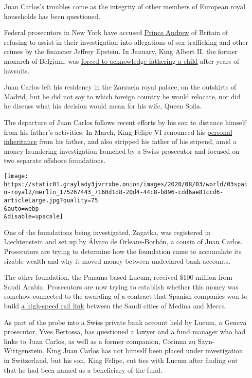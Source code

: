Juan Carlos's troubles come as the integrity of other members of
European royal households has been questioned.

Federal prosecutors in New York have accused
\href{https://www.nytimes3xbfgragh.onion/2020/06/08/nyregion/jeffrey-epstein-prince-andrew.html}{Prince
Andrew} of Britain of refusing to assist in their investigation into
allegations of sex trafficking and other crimes by the financier Jeffrey
Epstein. In January, King Albert II, the former monarch of Belgium, was
\href{https://www.nytimes3xbfgragh.onion/2020/01/28/world/europe/belgium-king-albert-delphine-boel.html}{forced
to acknowledge fathering a child} after years of lawsuits.

Juan Carlos left his residency in the Zarzuela royal palace, on the
outskirts of Madrid, but he did not say to which foreign country he
would relocate, nor did he discuss what his decision would mean for his
wife, Queen Sofia.

The departure of Juan Carlos follows recent efforts by his son to
distance himself from his father's activities. In March, King Felipe VI
renounced his
\href{https://www.nytimes3xbfgragh.onion/2020/03/15/world/europe/king-felipe-juan-carlos-spain.html}{personal
inheritance} from his father, and also stripped his father of his
stipend, amid a money laundering investigation launched by a Swiss
prosecutor and focused on two separate offshore foundations.

\texttt{[image: https://static01.graylady3jvrrxbe.onion/images/2020/08/03/world/03spain-royal2/merlin\_175267443\_7160d1d8-20d4-44c8-b896-cdd6ae81ccd6-articleLarge.jpg?quality=75\\\&auto=webp\\\&disable=upscale]}

One of the foundations being investigated, Zagatka, was registered in
Liechtenstein and set up by Álvaro de Orleans-Borbón, a cousin of Juan
Carlos. Prosecutors are trying to determine how the foundation came to
accumulate its sizable wealth and why it moved money between undeclared
bank accounts.

The other foundation, the Panama-based Lucum, received \$100 million
from Saudi Arabia. Prosecutors are now trying to establish whether this
money was somehow connected to the awarding of a contract that Spanish
companies won to build
\href{https://www.nytimes3xbfgragh.onion/2019/03/14/reader-center/saudi-arabia-high-speed-train-medina-mecca.html}{a
high-speed rail link} between the Saudi cities of Medina and Mecca.

As part of the probe into a Swiss private bank account held by Lucum, a
Geneva prosecutor, Yves Bertossa, has questioned a lawyer and a fund
manager who had links to Juan Carlos, as well as a former companion,
Corinna zu Sayn-Wittgenstein. King Juan Carlos has not himself been
placed under investigation in Switzerland, but his son, King Felipe, cut
ties with Lucum after finding out that he had been named as a
beneficiary of the fund.

